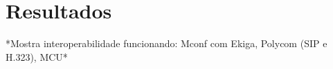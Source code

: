 \chapter{Resultados}\label{cha:resultados}

    *Mostra interoperabilidade funcionando: Mconf com Ekiga, Polycom (SIP e H.323), MCU*
	
	